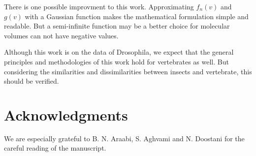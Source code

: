 \documentclass[11pt]{article} %
\begin{document}
There is one possible improvment to this work. Approximating $f_n(v)$ and $g(v)$ with a Gaussian function makes the mathematical formulation simple and readable. 
But a semi-infinite function may be a better choice for molecular volumes can not have negative values.

Although this work is on the data of Drosophila, 
we expect that the general principles and methodologies of this work hold for vertebrates as well. 
But considering the similarities and dissimilarities between insects and vertebrate, 
this should be verified.


\section*{Acknowledgments}
We are especially grateful to B. N. Araabi, S. Aghvami and N. Doostani for the careful reading of the manuscript.





\end{document}
